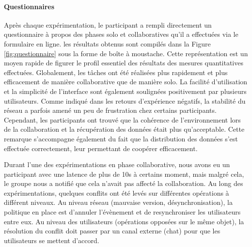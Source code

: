 \paragraph{Questionnaires}
Après chaque expérimentation, le participant a rempli directement un questionnaire 
à propos des phases solo et collaboratives qu'il a effectuées via le formulaire en 
ligne. les résultats obtenus sont compilés dans la Figure 
\ref{fig:questionnaire} sous la forme de boîte à moustache. Cette représentation 
est un moyen rapide de figurer le profil essentiel des résultats des mesures 
quantitatives effectuées.
Globalement, les tâches ont été réalisées plus rapidement et plus efficacement 
de manière collaborative que de manière solo. La facilité d'utilisation et la 
simplicité de l'interface sont également soulignées positivement par plusieurs 
utilisateurs. Comme indiqué dans les retours d'expérience négatifs, la stabilité du 
réseau a parfois amené un peu de frustration chez certains participants. 
Cependant, les participants ont trouvé que la cohérence de l'environnement lors de 
la collaboration et la récupération des données était plus qu'acceptable. Cette 
remarque s'accompagne également du fait que la distribution des données s'est 
effectuée correctement, leur permettant de coopérer efficacement.

Durant l'une des expérimentations en phase collaborative, nous avons eu un 
participant avec une latence de plus de 10s à certains moment, mais malgré cela, 
le groupe nous a notifié que cela n'avait pas affecté la collaboration. Au long des 
expérimentations, quelques conflits ont été levés sur différentes opérations à 
différent niveaux. Au niveau réseau (mauvaise version, désynchronisation), la 
politique en place est d'annuler l'évènement et de resynchroniser les utilisateurs 
entre eux. Au niveau des utilisateurs (opérations opposées sur le même objet), la 
résolution du conflit doit passer par un canal externe (chat) pour que les 
utilisateurs se mettent d'accord.  


